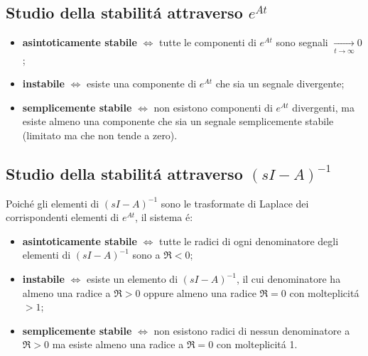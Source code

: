 \documentclass[../main.tex]{subfiles}
\begin{document}
	\subsection{Studio della stabilit\'a attraverso $ e^{At} $}       
		\begin{itemize}                                                           
			\item
				\textbf{asintoticamente stabile} $ \Leftrightarrow $ tutte le componenti di $ e^{At} $ sono segnali $ \xrightarrow[t \rightarrow \infty]{} 0 $;
			\item
				\textbf{instabile} $ \Leftrightarrow $ esiste una componente di $ e^{At} $ che sia un segnale divergente;
			\item
				\textbf{semplicemente stabile} $ \Leftrightarrow $ non esistono componenti di $ e^{At} $ divergenti, ma esiste almeno una componente che sia un segnale semplicemente stabile (limitato ma che non tende a zero).
		\end{itemize}
		
	\subsection{Studio della stabilit\'a attraverso $ (sI-A)^{-1} $}
		Poich\'e gli elementi di $ (sI-A)^{-1} $ sono le trasformate di Laplace dei corrispondenti elementi di $ e^{At} $, il sistema \'e:
		\begin{itemize}
			\item
				\textbf{asintoticamente stabile} $ \Leftrightarrow $ tutte le radici di ogni denominatore degli elementi di $ (sI-A)^{-1} $ sono a $ \Re < 0 $;
			\item
				\textbf{instabile} $ \Leftrightarrow $ esiste un elemento di $ (sI-A)^{-1} $, il cui denominatore ha almeno una radice a $ \Re > 0 $ oppure almeno una radice $ \Re = 0 $ con molteplicit\'a $ > 1 $;
			\item
				\textbf{semplicemente stabile} $ \Leftrightarrow $ non esistono radici di nessun denominatore a $ \Re > 0 $ ma esiste almeno una radice a $ \Re = 0 $ con molteplicit\'a 1.
		\end{itemize}
	
\end{document}
